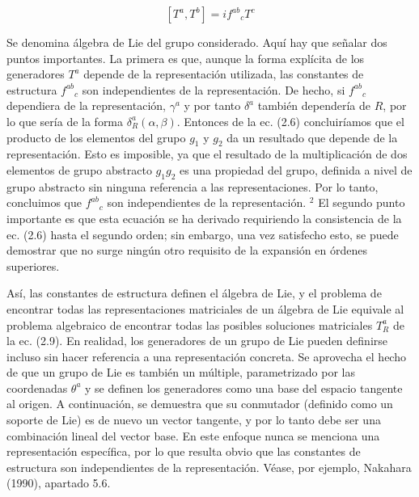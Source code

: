 \begin{equation*}
\left[T^{a}, T^{b}\right]=i f^{a b}{ }_{c} T^{c} \tag{2.9}
\end{equation*}


  Se denomina álgebra de Lie del grupo considerado. Aquí hay que señalar dos puntos importantes. La primera es que, aunque la forma explícita de los generadores $T^{a}$ depende de la representación utilizada, las constantes de estructura $f^{a b}{ }_{c}$ son independientes de la representación. De hecho, si $f^{a b}{ }_{c}$ dependiera de la representación, $\gamma^{a}$ y por tanto $\delta^{a}$ también dependería de $R$, por lo que sería de la forma $\delta_{R}^{a}(\alpha, \beta)$. Entonces de la ec. (2.6) concluiríamos que el producto de los elementos del grupo $g_{1}$ y $g_{2}$ da un resultado que depende de la representación. Esto es imposible, ya que el resultado de la multiplicación de dos elementos de grupo abstracto $g_{1} g_{2}$ es una propiedad del grupo, definida a nivel de grupo abstracto sin ninguna referencia a las representaciones. Por lo tanto, concluimos que $f^{a b}{ }_{c}$ son independientes de la representación. ${ }^{2}$ El segundo punto importante es que esta ecuación se ha derivado requiriendo la consistencia de la ec. (2.6) hasta el segundo orden; sin embargo, una vez satisfecho esto, se puede demostrar que no surge ningún otro requisito de la expansión en órdenes superiores.

Así, las constantes de estructura definen el álgebra de Lie, y el problema de encontrar todas las representaciones matriciales de un álgebra de Lie equivale al problema algebraico de encontrar todas las posibles soluciones matriciales $T_{R}^{a}$ de la ec. (2.9). En realidad, los generadores de un grupo de Lie pueden definirse incluso sin hacer referencia a una representación concreta. Se aprovecha el hecho de que un grupo de Lie es también un múltiple, parametrizado por las coordenadas $\theta^{a}$ y se definen los generadores como una base del espacio tangente al origen. A continuación, se demuestra que su conmutador (definido como un soporte de Lie) es de nuevo un vector tangente, y por lo tanto debe ser una combinación lineal del vector base. En este enfoque nunca se menciona una representación específica, por lo que resulta obvio que las constantes de estructura son independientes de la representación. Véase, por ejemplo, Nakahara (1990), apartado 5.6.


